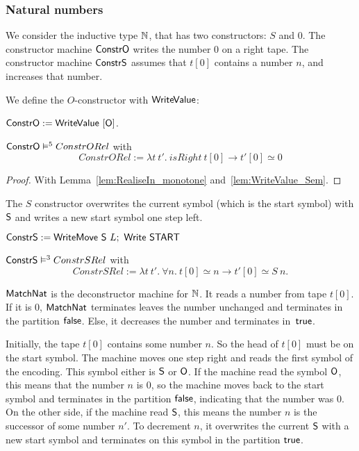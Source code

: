 \subsubsection{Natural numbers}
\label{sec:match-nat}
%

We consider the inductive type $\mathbb{N}$, that has two constructors: $S$ and $0$.  The constructor machine $\MS{ConstrO}$ writes the number $0$ on a
right tape.  The constructor machine $\MS{ConstrS}$ assumes that $t[0]$ contains a number $n$, and increases that number.

We define the $O$-constructor with $\mathsf{WriteValue}$:
\begin{definition}[$\MS{ConstrO}$][Constr_O]
  \label{def:Constr_O}
  $\mathsf{ConstrO} := \mathsf{WriteValue}~[\mathsf{O}]$.
\end{definition}
\begin{lemma}
  \label{lem:Constr_O_Sem}
  $\mathsf{ConstrO} \mathrel{\vDash^{5}} ConstrORel$ with
  \[
    ConstrORel := \lambda t~t'.~isRight~t[0] \rightarrow t'[0] \simeq 0
  \]
\end{lemma}
\begin{proof}
  With Lemma~\ref{lem:RealiseIn_monotone} and~\ref{lem:WriteValue_Sem}.
\end{proof}

The $S$ constructor overwrites the current symbol (which is the start symbol) with $\mathsf{S}$ and writes a new start symbol one step left.
\begin{definition}[$\MS{ConstrS}$][Constr_S]
  $\mathsf{ConstrS} := \mathsf{WriteMove}~\mathsf{S}~L ;~ \mathsf{Write}~\mathsf{START}$
\end{definition}
\begin{lemma}
  $\mathsf{ConstrS} \mathrel{\vDash^{3}} ConstrSRel$ with
  \[
    ConstrSRel := \lambda t~t'.~\forall n.~ t[0] \simeq n \rightarrow t'[0] \simeq S~n.
  \]
\end{lemma}


$\mathsf{MatchNat}$ is the deconstructor machine for $\mathbb{N}$.  It reads a number from tape $t[0]$.  If it is $0$, $\mathsf{MatchNat}$ terminates leaves the
number unchanged and terminates in the partition $\mathsf{false}$.  Else, it decreases the number and terminates in~$\mathsf{true}$.

Initially, the tape $t[0]$ contains some number $n$.  So the head of $t[0]$ must be on the start symbol.  The machine moves one step right and reads
the first symbol of the encoding.  This symbol either is $\mathsf{S}$ or $\mathsf{O}$.  If the machine read the symbol $\mathsf{O}$, this means that the number
$n$ is $0$, so the machine moves back to the start symbol and terminates in the partition $\mathsf{false}$, indicating that the number was $0$.  On the other
side, if the machine read $\mathsf{S}$, this means the number $n$ is the successor of some number $n'$.  To decrement $n$, it overwrites the current
$\mathsf{S}$ with a new start symbol and terminates on this symbol in the partition $\mathsf{true}$.

